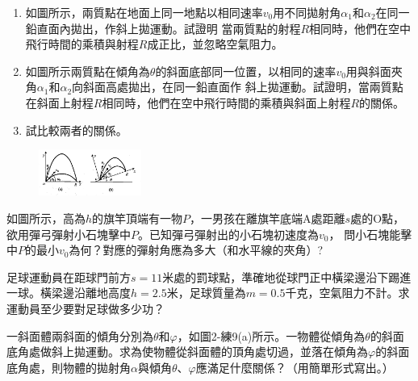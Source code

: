 \documentclass[cn,10pt,math=newtx,chinesefont=founder]{../elegantbook}
\begin{document}
\begin{example}
    \begin{enumerate}
        \item 如圖所示，兩質點在地面上同一地點以相同速率$v_0$用不同拋射角$\alpha_1$和$\alpha_2$在同一鉛直面內拋出，作斜上拋運動。試證明
              當兩質點的射程$R$相同時，他們在空中飛行時間的乘積與射程$R$成正比，並忽略空氣阻力。
        \item 如圖所示兩質點在傾角為$\theta$的斜面底部同一位置，以相同的速率$v_0$用與斜面夾角$\alpha_1$和$\alpha_2$向斜面高處拋出，在同一鉛直面作
              斜上拋運動。試證明，當兩質點在斜面上射程$R$相同時，他們在空中飛行時間的乘積與斜面上射程$R$的關係。
        \item 試比較兩者的關係。
    \end{enumerate}
    \rightline{[練2-6]}
\end{example}
\begin{figure}[htbp]
    \flushright
    \includegraphics[width=0.3\textwidth]{image/prac_2_6.png}
\end{figure}
\newpage

\begin{example}
    如圖所示，高為$h$的旗竿頂端有一物$P$，一男孩在離旗竿底端A處距離$s$處的O點，欲用彈弓彈射小石塊擊中$P$。已知彈弓彈射出的小石塊初速度為$v_0$，
    問小石塊能擊中$P$的最小$v_0$為何？對應的彈射角應為多大（和水平線的夾角）?\\
    \rightline{[練2-7]}
\end{example}
\newpage

\begin{example}
    足球運動員在距球門前方$s=11$米處的罰球點，準確地從球門正中橫梁邊沿下踢進一球。橫梁邊沿離地高度$h=2.5$米，足球質量為$m=0.5$千克，空氣阻力不計。求運動員至少要對足球做多少功？
    
    \rightline{[練2-8]}
\end{example}

\begin{solution}

\end{solution}




\newpage

\begin{example}
    一斜面體兩斜面的傾角分別為$\theta$和$\varphi$，如圖2-練9(a)所示。一物體從傾角為$\theta$的斜面底角處做斜上拋運動。求為使物體從斜面體的頂角處切過，並落在傾角為$\varphi$的斜面底角處，則物體的拋射角$\alpha$與傾角$\theta$、$\varphi$應滿足什麼關係？（用簡單形式寫出。）
    
    \rightline{[練2-9]}
\end{example}
\end{document}
